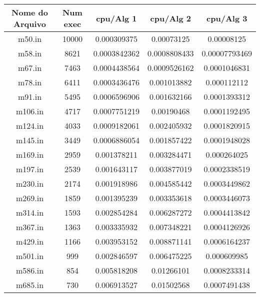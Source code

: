 \documentclass[10pt,a4paper]{article}
\begin{document}
	\begin{center}
		\begin{tabular}{|c|c|c|c|c|}
			\hline
			Nome do Arquivo & Num exec & cpu/Alg 1 & cpu/Alg 2 & cpu/Alg 3 \\
			\hline
			m50.in & 10000 &  0.000309375  &  0.00073125 & 0.00008125\\
			\hline 
			m58.in & 8621 &    0.0003842362    &    0.0008808433    & 0.00007793469\\
			\hline 
			m67.in & 7463 &    0.0004438564    &    0.0009526162    &    0.0001046831\\
			\hline 
			m78.in & 6411 &    0.0003436476    &    0.001013882     &    0.000112112\\
			\hline 
			m91.in &  5495 &    0.0006596906    &    0.001632166     &    0.0001393312\\
			\hline 
			m106.in &  4717 &    0.0007751219    &    0.00190468      &    0.0001192495\\
			\hline 
			m124.in &  4033  &    0.0009182061    &    0.002405932     &    0.0001820915\\
			\hline 
			m145.in & 3449 &    0.0006886054    &    0.001857422     &    0.0001948028\\
			\hline 
			m169.in & 2959  &    0.001378211     &    0.003284471     &    0.000264025\\
			\hline 
			m197.in & 2539  &    0.001643117     &    0.003877019     &    0.0002338519\\
			\hline 
			m230.in &  2174  &    0.001918986     &    0.004585442     &    0.0003449862\\
			\hline 
			m269.in &  1859  &    0.001395239     &    0.003353618     &    0.0003446073\\
			\hline 
			m314.in &  1593 &    0.002854284     &    0.006287272     &    0.0004413842\\
			\hline 
			m367.in & 1363  &    0.003335932     &    0.007348221     &    0.0004126926\\
			\hline 
			m429.in &  1166  &    0.003953152     &    0.008871141     &    0.0006164237\\
			\hline 
			m501.in &  999 &    0.002846597     &    0.006475225     &    0.000609985\\
			\hline 
			m586.in &  854  &    0.005818208     &    0.01266101      &    0.0008233314\\
			\hline 
			m685.in &  730 &    0.006913527     &    0.01502568      &    0.0007491438\\
			\hline 

\end{tabular}
\end{center}
\end{document}
